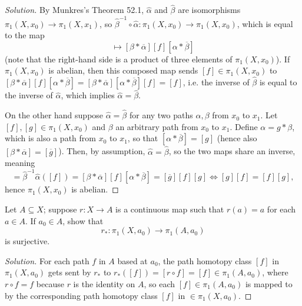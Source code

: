 \documentclass[10pt]{article}
\providecommand{\ol}{\overline}
\providecommand{\inv}{^{-1}}
\newenvironment{soln}{\begin{proof}[Solution]}{\end{proof}}
\begin{document}
\begin{soln}
    By Munkres's Theorem 52.1, $\widehat \alpha$ and $\widehat \beta$
    are isomorphisms $\pi_1(X,x_0)\to\pi_1(X,x_1)$,
    so $\widehat\beta\inv\circ\widehat\alpha\colon\pi_1(X,x_0)\to\pi_1(X,x_0)$,
    which is equal to the map
    \begin{equation*}
	[f]\mapsto [\beta * \ol\alpha][f][\alpha * \ol\beta]
    \end{equation*}
    (note that the right-hand side is a product of three elements of $\pi_1(X,x_0)$).
    If $\pi_1(X,x_0)$ is abelian, then this composed map
    sends $[f]\in\pi_1(X,x_0)$ to $[\beta*\ol\alpha][f][\alpha*\ol\beta]
    = [\beta*\ol\alpha][\alpha*\ol\beta][f] = [f]$,
    i.e. the inverse of $\widehat\beta$ is equal to the inverse of $\widehat\alpha$,
    which implies $\widehat\alpha = \widehat\beta$.

    On the other hand suppose $\widehat\alpha = \widehat\beta$
    for any two paths $\alpha,\beta$ from $x_0$ to $x_1$.
    Let $[f],[g]\in\pi_1(X,x_0)$ and $\beta$ an arbitrary path
    from $x_0$ to $x_1$. Define $\alpha = g*\beta$,
    which is also a path from $x_0$ to $x_1$,
    so that $[\alpha*\ol\beta] = [g]$
    (hence also $[\beta*\ol\alpha] = [\ol g]$).
    Then, by assumption, $\widehat\alpha = \widehat\beta$,
    so the two maps share an inverse, meaning
    \begin{equation*}
	[f] = \widehat\beta\inv\widehat\alpha([f])
	= [\beta*\ol\alpha][f][\alpha*\ol\beta]
	= [\ol g][f][g]
	\iff [g][f] = [f][g],
    \end{equation*}
    hence $\pi_1(X,x_0)$ is abelian.
\end{soln}

\begin{problem}
    [Munkres 52.4]
    Let $A\subseteq X$; suppose $r\colon X\to A$ is
    a continuous map such that $r(a) = a$ for each $a\in A$.
    If $a_0\in A$, show that
    \begin{equation*}
        r_*\colon\pi_1(X,a_0)\to\pi_1(A,a_0)
    \end{equation*}
    is surjective.
\end{problem}

\begin{soln}
    For each path $f$ in $A$ based at $a_0$,
    the path homotopy class $[f]$ in $\pi_1(X,a_0)$ gets sent by $r_*$ to
    $r_*([f]) = [r\circ f] = [f]\in\pi_1(A,a_0)$,
    where $r\circ f = f$ because $r$ is the identity on $A$,
    so each $[f]\in\pi_1(A,a_0)$ is mapped to by the corresponding
    path homotopy class $[f]$ in $\in\pi_1(X,a_0)$.
\end{soln}
\end{document}
